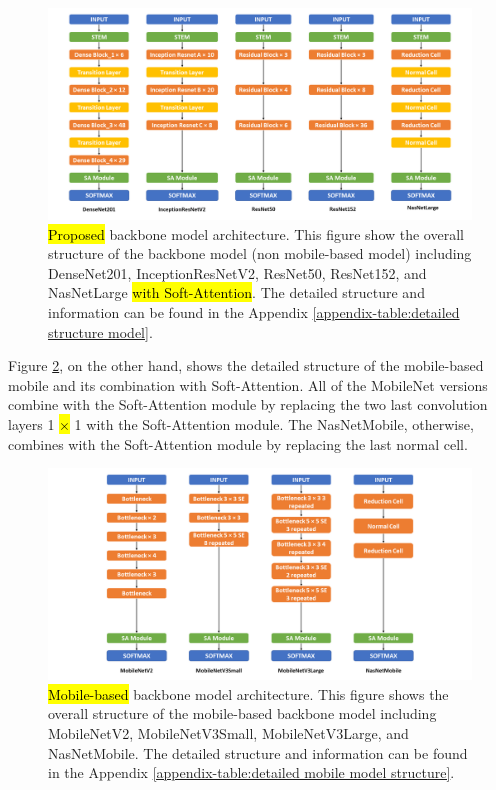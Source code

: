 \documentclass[sensors,article,accept,pdftex,moreauthors]{Definitions/mdpi}
\begin{document}
	\begin{figure}[H]
		\includegraphics[width=0.9\linewidth]{Definitions/Model Structure}
		\caption{\hl{Proposed} %
 backbone model architecture. This figure show the overall structure of the backbone model (non mobile-based model) including DenseNet201, InceptionResNetV2, ResNet50, ResNet152, and NasNetLarge \hl{with Soft-Attention}. The detailed structure and information can be found in the Appendix \ref{appendix-table:detailed structure model}.}
		\label{fig:model-structure}
	\end{figure}
	
	Figure \ref{fig:mobile-model-structure}, on the other hand, shows the detailed structure of the mobile-based mobile and its combination with Soft-Attention. All of the MobileNet versions combine with the Soft-Attention module by replacing the two last convolution layers 1 \hl{$\times$} %
 1 with the Soft-Attention module. The NasNetMobile, otherwise, combines with the Soft-Attention module by replacing the last normal cell. 
	\begin{figure}[H]
		\includegraphics[width=0.9\linewidth]{Definitions/Mobile Model Structure}
		\caption{\hl{Mobile-based} %
 backbone model architecture. This figure shows the overall structure of the mobile-based backbone model including MobileNetV2, MobileNetV3Small, MobileNetV3Large, and NasNetMobile. The detailed structure and information can be found in the Appendix \ref{appendix-table:detailed mobile model structure}.}
		\label{fig:mobile-model-structure}
	\end{figure}
	
\end{document}
